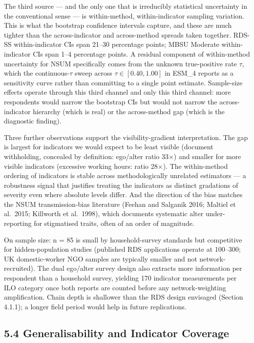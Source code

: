 \documentclass[
  12pt,
  letterpaper,
  DIV=11,
  numbers=noendperiod]{scrartcl}
\begin{document}
The third source --- and the only one that is irreducibly statistical
uncertainty in the conventional sense --- is within-method,
within-indicator sampling variation. This is what the bootstrap
confidence intervals capture, and these are much tighter than the
across-indicator and across-method spreads taken together. RDS-SS
within-indicator CIs span 21--30 percentage points; MBSU Moderate
within-indicator CIs span 1--4 percentage points. A residual component
of within-method uncertainty for NSUM specifically comes from the
unknown true-positive rate \(\tau\), which the continuous-\(\tau\) sweep
across \(\tau \in [0.40, 1.00]\) in ESM\_4 reports as a sensitivity
curve rather than committing to a single point estimate. Sample-size
effects operate through this third channel and only this third channel:
more respondents would narrow the bootstrap CIs but would not narrow the
across-indicator hierarchy (which is real) or the across-method gap
(which is the diagnostic finding).

Three further observations support the visibility-gradient
interpretation. The gap is largest for indicators we would expect to be
least visible (document withholding, concealed by definition: ego/alter
ratio 33\(\times\)) and smaller for more visible indicators (excessive
working hours: ratio 28\(\times\)). The within-method ordering of
indicators is stable across methodologically unrelated estimators --- a
robustness signal that justifies treating the indicators as distinct
gradations of severity even where absolute levels differ. And the
direction of the bias matches the NSUM transmission-bias literature
(Feehan and Salganik 2016; Maltiel et al.~2015; Killworth et al.~1998),
which documents systematic alter under-reporting for stigmatised traits,
often of an order of magnitude.

On sample size: n = 85 is small by household-survey standards but
competitive for hidden-population studies (published RDS applications
operate at 100--300; UK domestic-worker NGO samples are typically
smaller and not network-recruited). The dual ego/alter survey design
also extracts more information per respondent than a household survey,
yielding 170 indicator measurements per ILO category once both reports
are counted before any network-weighting amplification. Chain depth is
shallower than the RDS design envisaged (Section 4.1.1); a longer field
period would help in future replications.

\subsection{5.4 Generalisability and Indicator
Coverage}\label{generalisability-and-indicator-coverage}
\end{document}

